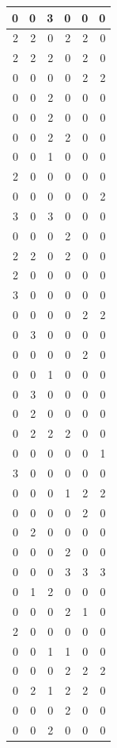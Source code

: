 \documentclass[
]{article}
\begin{document}
\begin{tabular}{r|r|r|r|r|r}
\hline
0 & 0 & 3 & 0 & 0 & 0\\
\hline
2 & 2 & 0 & 2 & 2 & 0\\
\hline
2 & 2 & 2 & 0 & 2 & 0\\
\hline
0 & 0 & 0 & 0 & 2 & 2\\
\hline
0 & 0 & 2 & 0 & 0 & 0\\
\hline
0 & 0 & 2 & 0 & 0 & 0\\
\hline
0 & 0 & 2 & 2 & 0 & 0\\
\hline
0 & 0 & 1 & 0 & 0 & 0\\
\hline
2 & 0 & 0 & 0 & 0 & 0\\
\hline
0 & 0 & 0 & 0 & 0 & 2\\
\hline
3 & 0 & 3 & 0 & 0 & 0\\
\hline
0 & 0 & 0 & 2 & 0 & 0\\
\hline
2 & 2 & 0 & 2 & 0 & 0\\
\hline
2 & 0 & 0 & 0 & 0 & 0\\
\hline
3 & 0 & 0 & 0 & 0 & 0\\
\hline
0 & 0 & 0 & 0 & 2 & 2\\
\hline
0 & 3 & 0 & 0 & 0 & 0\\
\hline
0 & 0 & 0 & 0 & 2 & 0\\
\hline
0 & 0 & 1 & 0 & 0 & 0\\
\hline
0 & 3 & 0 & 0 & 0 & 0\\
\hline
0 & 2 & 0 & 0 & 0 & 0\\
\hline
0 & 2 & 2 & 2 & 0 & 0\\
\hline
0 & 0 & 0 & 0 & 0 & 1\\
\hline
3 & 0 & 0 & 0 & 0 & 0\\
\hline
0 & 0 & 0 & 1 & 2 & 2\\
\hline
0 & 0 & 0 & 0 & 2 & 0\\
\hline
0 & 2 & 0 & 0 & 0 & 0\\
\hline
0 & 0 & 0 & 2 & 0 & 0\\
\hline
0 & 0 & 0 & 3 & 3 & 3\\
\hline
0 & 1 & 2 & 0 & 0 & 0\\
\hline
0 & 0 & 0 & 2 & 1 & 0\\
\hline
2 & 0 & 0 & 0 & 0 & 0\\
\hline
0 & 0 & 1 & 1 & 0 & 0\\
\hline
0 & 0 & 0 & 2 & 2 & 2\\
\hline
0 & 2 & 1 & 2 & 2 & 0\\
\hline
0 & 0 & 0 & 2 & 0 & 0\\
\hline
0 & 0 & 2 & 0 & 0 & 0\\

\end{tabular}
\end{document}
